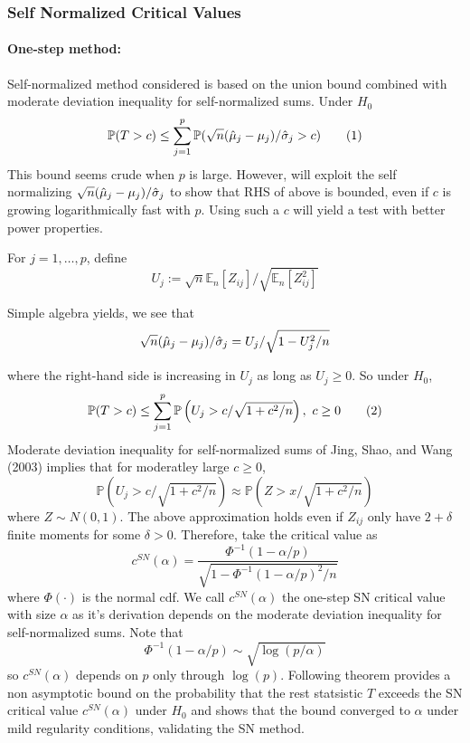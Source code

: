 \subsubsection{Self Normalized Critical Values}
\paragraph{One-step method:}

Self-normalized method considered is based on the union bound combined with moderate deviation inequality for self-normalized sums. Under $H_0$
\[\mathbb{P}(T > c) \leq \sum_{j=1}^p \mathbb{P}(\sqrt{n}(\muH_j -\mu_j)/\sigmaH_j > c) \numberthis\]
This bound seems crude when $p$ is large. However, will exploit the self normalizing $\sqrt{n}(\hat{\mu}_j - \mu_j)/\hat{\sigma}_j$ to show that RHS of above is bounded, even if $c$ is growing logarithmically fast with $p$. Using such a $c$ will yield a test with better power properties. 

For $j = 1,\dots, p$, define 
\[U_j := \sqrt{n}\mathbb{E}_n[Z_{ij}]/\sqrt{\mathbb{E}_n[Z_{ij}^2]}\]

Simple algebra yields, we see that 
\[\sqrt{n}(\hat{\mu}_j - \mu_j)/\hat{\sigma}_j = U_j/\sqrt{1 - U_j^2/n} \]

where the right-hand side is increasing in $U_j$ as long as $U_j \geq 0$. So under $H_0$, 
\[\mathbb{P}(T > c) \leq \sum_{j=1}^p \mathbb{P}\left( U_j > c/\sqrt{1 + c^2/n}   \right), \hbox{ }c \geq 0 \numberthis \]
Moderate deviation inequality for self-normalized sums of Jing, Shao, and Wang (2003) implies that for moderatley large $c\geq 0$,
\[\mathbb{P}\left(U_j > c/\sqrt{1 + c^2/n}\right) \approx \mathbb{P}\left(Z > x/\sqrt{1 + c^2/n}\right) \]
where $Z \sim N(0,1)$. The above approximation holds even if $Z_{ij}$ only have $2 + \delta$ finite moments for some $\delta > 0$. Therefore, take the critical value as 
\begin{equation}
	\label{eq:cSN}
	c^{SN}(\alpha) = \frac{\Phi^{-1}(1 - \alpha/p)}{\sqrt{1 - \Phi^{-1}(1- \alpha/p)^2/n}} 
\end{equation}
where $\Phi(\cdot)$ is the normal cdf. We call $c^{SN}(\alpha)$ the one-step SN critical value with size $\alpha$ as it's derivation depends on the moderate deviation inequality for self-normalized sums. Note that 
\[\Phi^{-1}(1-\alpha/p) \sim \sqrt{\log(p/\alpha)}\]
so $c^{SN}(\alpha)$ depends on $p$ only through $\log(p)$. Following theorem provides a non asymptotic bound on the probability that the rest statsistic $T$ exceeds the SN critical value $c^{SN}(\alpha)$ under $H_0$ and shows that the bound converged to $\alpha$ under mild regularity conditions, validating the SN method. 

